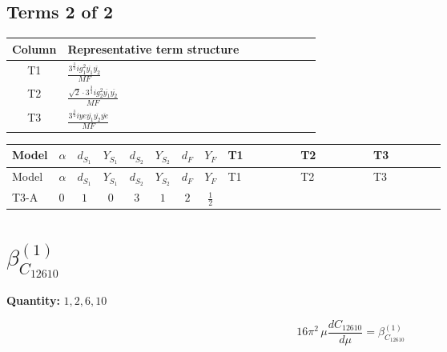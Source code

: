 \documentclass[8pt]{article}
\begin{document}
\begin{landscape}
\subsection*{Terms 2 of 2}
\begin{center}
\begin{tabular}{@{}c >{\raggedright\arraybackslash}p{0.82\linewidth}@{}}
\toprule
Column & Representative term structure \\
\midrule
T1 & \(\displaystyle \frac{3^{\frac{3}{4}} i g_{1}^{2} \overline{y_{1}} \overline{y_{2}}}{MF}\) \\
\midrule
T2 & \(\displaystyle \frac{\sqrt{2} \cdot 3^{\frac{3}{4}} i g_{2}^{2} \overline{y_{1}} \overline{y_{2}}}{MF}\) \\
\midrule
T3 & \(\displaystyle \frac{3^{\frac{3}{4}} i ye \overline{y_{1}} \overline{y_{2}} \overline{ye}}{MF}\) \\
\midrule
\bottomrule
\end{tabular}
\end{center}
\smallskip
\tiny
\begin{longtable}{@{}llcccccc >{\raggedright\arraybackslash}p{0.21\linewidth} >{\raggedright\arraybackslash}p{0.21\linewidth} >{\raggedright\arraybackslash}p{0.21\linewidth}@{}}
\toprule
Model & $\alpha$ & $d_{S_1}$ & $Y_{S_1}$ & $d_{S_2}$ & $Y_{S_2}$ & $d_F$ & $Y_F$ & T1 & T2 & T3 \\
\midrule
\endfirsthead
\toprule
Model & $\alpha$ & $d_{S_1}$ & $Y_{S_1}$ & $d_{S_2}$ & $Y_{S_2}$ & $d_F$ & $Y_F$ & T1 & T2 & T3 \\
\midrule
\endhead
T3-A & $0$ & $1$ & $0$ & $3$ & $1$ & $2$ & $\frac{1}{2}$ & \scriptsize\adjustbox{max width=\linewidth}{$\begin{gathered} - \frac{3^{\frac{3}{4}} i g_{1}^{2} \overline{y_{1}} \overline{y_{2}}}{8 MF}\end{gathered}$} & \scriptsize\adjustbox{max width=\linewidth}{$\begin{gathered} - \frac{\sqrt{2} \cdot 3^{\frac{3}{4}} i g_{2}^{2} \overline{y_{1}} \overline{y_{2}}}{6 MF}\end{gathered}$} & \scriptsize\adjustbox{max width=\linewidth}{$\begin{gathered} \frac{3^{\frac{3}{4}} i ye \overline{y_{1}} \overline{y_{2}} \overline{ye}}{12 MF}\end{gathered}$} \\
\midrule
\bottomrule
\end{longtable}
\clearpage
\section*{$\beta_{C_{12610}}^{(1)}$}
\noindent\textbf{Quantity: }$\mathrm{1,2,6,10}$\par\smallskip
\[16\pi^2\,\mu\frac{d C_{12610}}{d\mu}=\beta_{C_{12610}}^{(1)}\]

\end{landscape}
\end{document}
